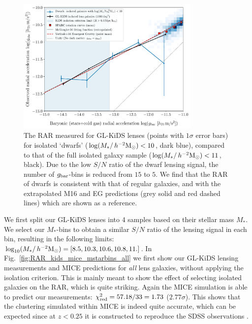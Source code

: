 \documentclass[usenatbib]{mnras}
\newcommand{\hmsun}{\,h^{-2} {\rm M_\odot}}
\newcommand{\un}[1]{_{\rm #1}}
\begin{document}
\begin{figure}
	\includegraphics[width=0.8\textwidth]{Figures/RAR_KiDS+dwarfs_Nobins_isolated.pdf}
	\caption{The RAR measured for GL-KiDS lenses (points with $1\sigma$ error bars) for isolated `dwarfs' ($\log(M_*/\hmsun)<10$, dark blue), compared to that of the full isolated galaxy sample ($\log(M_*/\hmsun) < 11$, black). Due to the low $S/N$ ratio of the dwarf lensing signal, the number of $g\un{bar}$-bins is reduced from $15$ to $5$. We find that the RAR of dwarfs is consistent with that of regular galaxies, and with the extrapolated M16 and EG predictions (grey solid and red dashed lines) which are shown as a reference.}
	\label{fig:RAR_kids_dwarfs}
\end{figure}

We first split our GL-KiDS lenses into 4 samples based on their stellar mass $M_*$. We select our $M_*$-bins to obtain a similar $S/N$ ratio of the lensing signal in each bin, resulting in the following limits: $\log_{10}(M_*/\hmsun) = [8.5,10.3,10.6,10.8,11.]$. In Fig.~\ref{fig:RAR_kids_mice_mstarbins_all} we first show our GL-KiDS lensing measurements and MICE predictions for \emph{all} lens galaxies, without applying the isolation criterion. This is mainly meant to show the effect of selecting isolated galaxies on the RAR, which is quite striking. Again the MICE simulation is able to predict our measurements: $\chi\un{red}^2 = 57.18 / 33 = 1.73$ ($2.77 \sigma$). This shows that the clustering simulated within MICE is indeed quite accurate, which can be expected since at $z<0.25$ it is constructed to reproduce the SDSS observations \cite[]{zehavi2011}.
\end{document}
